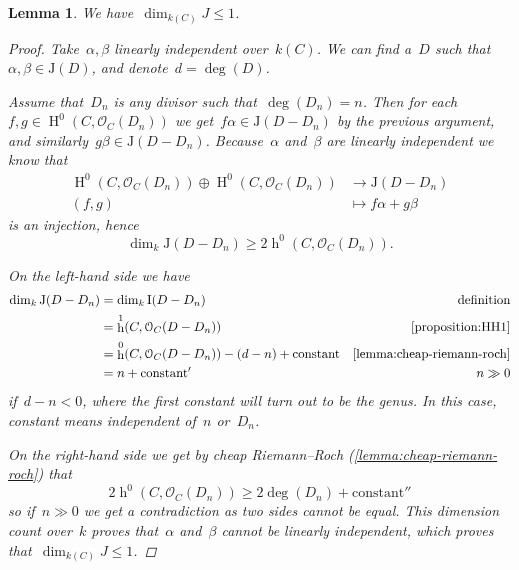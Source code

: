\documentclass[10pt,a4paper]{article}
\theoremstyle{lecture}
\newtheorem{lemma}[theorem]{Lemma}
\DeclareMathOperator\hh{h}
\DeclareMathOperator\HH{H}
\begin{document}
\begin{lemma}
  \label{lemma:dim(J)<=1}
  We have~$\dim_{k(C)}J\leq 1$.
  \begin{proof}
    Take~$\alpha,\beta$ linearly independent over~$k(C)$. We can find a~$D$ such that~$\alpha,\beta\in\mathrm{J}(D)$, and denote~$d=\deg(D)$.

    Assume that~$D_n$ is any divisor such that~$\deg(D_n)=n$. Then for each~$f,g\in\HH^0(C,\mathcal{O}_C(D_n))$ we get~$f\alpha\in\mathrm{J}(D-D_n)$ by the previous argument, and similarly~$g\beta\in\mathrm{J}(D-D_n)$. Because~$\alpha$ and~$\beta$ are linearly independent we know that
    \begin{equation}
      \begin{aligned}
        \HH^0(C,\mathcal{O}_C(D_n))\oplus\HH^0(C,\mathcal{O}_C(D_n))&\to\mathrm{J}(D-D_n) \\
        (f,g)&\mapsto f\alpha+g\beta
      \end{aligned}
    \end{equation}
    is an injection, hence
    \begin{equation}
      \dim_k\mathrm{J}(D-D_n)\geq 2\hh^0(C,\mathcal{O}_C(D_n)).
    \end{equation}

    On the left-hand side we have
    \begin{equation}
      \begin{aligned}
        \dim_k\mathrm{J}(D-D_n)&=\dim_k\mathrm{I}(D-D_n) & \text{definition} \\
        &=\hh^1(C,\mathcal{O}_C(D-D_n)) & \text{\cref{proposition:HH1}} \\
        &=\hh^0(C,\mathcal{O}_C(D-D_n))-(d-n)+\text{constant} & \text{\cref{lemma:cheap-riemann-roch}} \\
        &=n+\text{constant}' & n\gg 0
      \end{aligned}
    \end{equation}
    if~$d-n<0$, where the first constant will turn out to be the genus. In this case, constant means independent of~$n$ or~$D_n$.

    On the right-hand side we get by cheap Riemann--Roch (\cref{lemma:cheap-riemann-roch}) that
    \begin{equation}
      2\hh^0(C,\mathcal{O}_C(D_n))\geq 2\deg(D_n)+\text{constant}''
    \end{equation}
    so if~$n\gg 0$ we get a contradiction as two sides cannot be equal. This dimension count over~$k$ proves that~$\alpha$ and~$\beta$ cannot be linearly independent, which proves that~$\dim_{k(C)}J\leq 1$.
  \end{proof}
\end{lemma}
\end{document}
